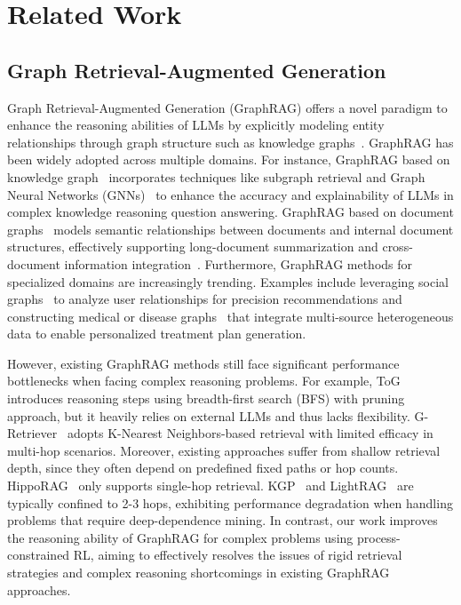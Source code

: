 \section{Related Work}
\subsection{Graph Retrieval-Augmented Generation}
Graph Retrieval-Augmented Generation (GraphRAG) offers a novel paradigm to enhance the reasoning abilities of LLMs 
by explicitly modeling entity relationships through graph structure such as knowledge graphs~\cite{pengsurvey,hansurvey}. %
GraphRAG has been widely adopted across multiple domains. For instance, GraphRAG based on knowledge graph~\cite{pan2024unifying} incorporates techniques like subgraph retrieval and Graph Neural Networks (GNNs)~\cite{he2024grtriever} to enhance the accuracy and explainability of LLMs in complex knowledge reasoning question answering. GraphRAG based on document graphs~\cite{sonawane2014graph} models semantic relationships between documents and internal document structures, effectively supporting long-document summarization and cross-document information integration~\cite{sarthi2024raptor}. Furthermore, GraphRAG methods for specialized domains are increasingly trending. Examples include leveraging social graphs~\cite{jiang2023social,zeng2024large} to analyze user relationships for precision recommendations and constructing medical or disease graphs~\cite{yang2024kg,li2024dalk} that integrate multi-source heterogeneous data to enable personalized treatment plan generation.

However, existing GraphRAG methods still face significant performance bottlenecks when facing complex reasoning problems.
For example, ToG~\cite{tog,tog2} introduces reasoning steps using breadth-first search (BFS) with pruning approach, but it heavily relies on external LLMs and thus lacks flexibility. 
G-Retriever~\cite{he2024grtriever} adopts K-Nearest Neighbors-based retrieval with limited efficacy in multi-hop scenarios. 
Moreover, existing approaches suffer from shallow retrieval depth, since they often depend on predefined fixed paths or hop counts. 
HippoRAG~\cite{jimenez2024hipporag,gutierrez2025hipporag2} 
only supports single-hop retrieval. 
KGP~\cite{wang2024kgp} and LightRAG~\cite{guo2024lightrag} are typically confined to 2-3 hops, exhibiting performance degradation when handling problems that require deep-dependence mining. 
In contrast, our work improves the reasoning ability of GraphRAG for complex problems using process-constrained RL, aiming to 
effectively resolves the issues of rigid retrieval strategies and complex reasoning shortcomings in existing GraphRAG approaches.


